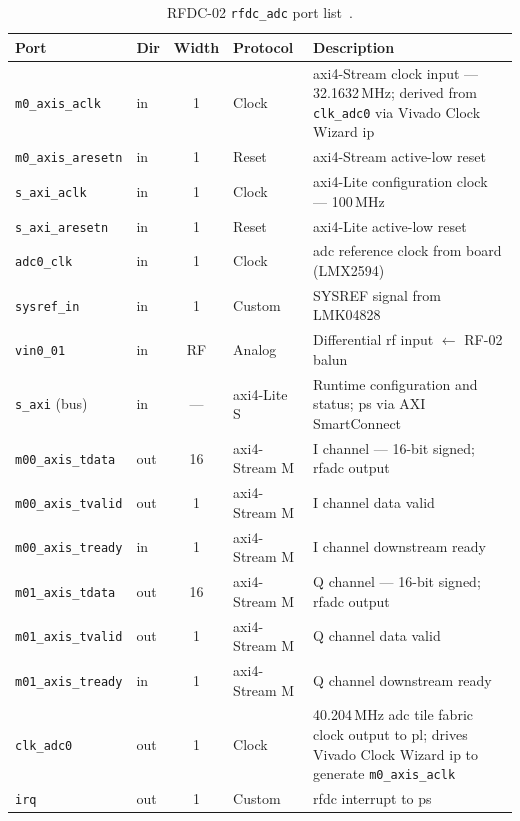 \FloatBarrier

\begin{table}[htbp]
  \caption{RFDC-02 \texttt{rfdc\_adc} port list~\cite{AMD_PG269}.}
  \label{tab:rfdc02_ports}
  \centering
  \small
  \begin{tabular}{llcp{2.6cm}p{5.8cm}}
    \hline
    Port                         & Dir  & Width & Protocol
      & Description \\
    \hline
    \texttt{m0\_axis\_aclk}      & in   & 1     & Clock
  & \ac{axi}4-Stream clock input --- 32.1632\,MHz;
    derived from \texttt{clk\_adc0} via Vivado Clock Wizard \ac{ip} \\[2pt]
    \texttt{m0\_axis\_aresetn}   & in   & 1     & Reset
      & \ac{axi}4-Stream active-low reset \\[2pt]
    \texttt{s\_axi\_aclk}        & in   & 1     & Clock
      & \ac{axi}4-Lite configuration clock --- 100\,MHz \\[2pt]
    \texttt{s\_axi\_aresetn}     & in   & 1     & Reset
      & \ac{axi}4-Lite active-low reset \\[2pt]
    \texttt{adc0\_clk}           & in   & 1     & Clock
      & \ac{adc} reference clock from board
        (LMX2594)~\cite{TI_LMX2594} \\[2pt]
    \texttt{sysref\_in}          & in   & 1     & Custom
      & SYSREF signal from LMK04828~\cite{TI_LMK04828} \\[2pt]
    \texttt{vin0\_01}            & in   & RF    & Analog
      & Differential \ac{rf} input $\leftarrow$ RF-02
        balun~\cite{RealDigital_A6} \\[2pt]
    \texttt{s\_axi} (bus)        & in   & ---   & \ac{axi}4-Lite S
      & Runtime configuration and status;
        \ac{ps} via AXI SmartConnect \\[2pt]
    \texttt{m00\_axis\_tdata}    & out  & 16    & \ac{axi}4-Stream M
      & I channel --- 16-bit signed; \ac{rfadc} output \\[2pt]
    \texttt{m00\_axis\_tvalid}   & out  & 1     & \ac{axi}4-Stream M
      & I channel data valid \\[2pt]
    \texttt{m00\_axis\_tready}   & in   & 1     & \ac{axi}4-Stream M
      & I channel downstream ready \\[2pt]
    \texttt{m01\_axis\_tdata}    & out  & 16    & \ac{axi}4-Stream M
      & Q channel --- 16-bit signed; \ac{rfadc} output \\[2pt]
    \texttt{m01\_axis\_tvalid}   & out  & 1     & \ac{axi}4-Stream M
      & Q channel data valid \\[2pt]
    \texttt{m01\_axis\_tready}   & in   & 1     & \ac{axi}4-Stream M
      & Q channel downstream ready \\[2pt]
    \texttt{clk\_adc0}           & out  & 1     & Clock
  & 40.204\,MHz \ac{adc} tile fabric clock output to \ac{pl};
    drives Vivado Clock Wizard \ac{ip} to generate
    \texttt{m0\_axis\_aclk} \\[2pt]
    \texttt{irq}                 & out  & 1     & Custom
      & \ac{rfdc} interrupt to \ac{ps} \\
    \hline
  \end{tabular}
\end{table}

